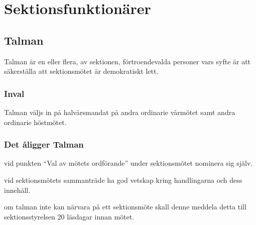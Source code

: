 \section{Sektionsfunktionärer}

\subsection{Talman}
Talman är en eller flera, av sektionen, förtroendevalda personer vars syfte är att säkerställa att sektionsmötet är demokratiskt lett. 

\subsubsection{Inval}
Talman väljs in på halvårsmandat på andra ordinarie vårmötet samt andra ordinarie höstmötet.
\subsubsection{Det åligger Talman}
\begin{att}
	\item vid punkten ``Val av mötets ordförande'' under sektionsmötet nominera sig själv.
	\item vid sektionsmötets sammanträde ha god vetskap kring handlingarna och dess innehåll.
	\item om talman inte kan närvara på ett sektionsmöte skall denne meddela detta till sektionsstyrelsen 20 läsdagar innan mötet.
\end{att}